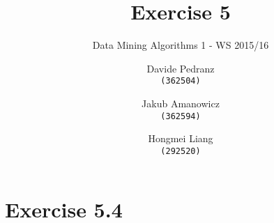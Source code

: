 \documentclass{scrartcl}
\title{Exercise 5}
\subtitle{Data Mining Algorithms 1 - WS 2015/16}
\author{
  Davide Pedranz\\ \texttt{(362504)}
  \and
  Jakub Amanowicz \\ \texttt{(362594)}
  \and
  Hongmei Liang\\  \texttt{(292520)}
}
\begin{document}
\section*{Exercise 5.4}

\end{document}
